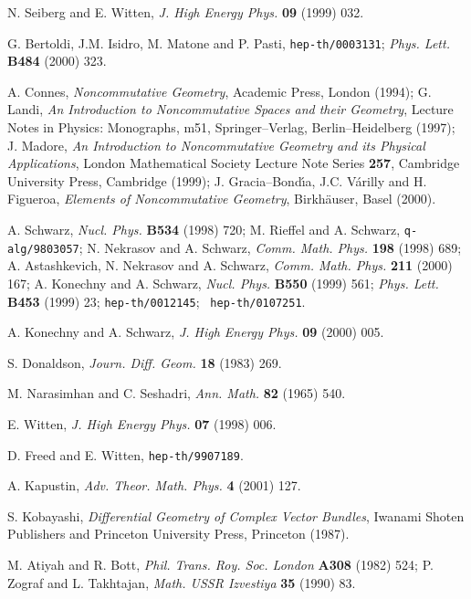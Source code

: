 \documentclass[a4paper,a4paper]{article}
\begin{document}
\begin{thebibliography}{99}
N. Seiberg and E. Witten, {\it J. High Energy Phys.} {\bf 09} (1999) 032.  

G. Bertoldi, J.M. Isidro, M. Matone and P. Pasti, {\tt hep-th/0003131}; 
{\it Phys. Lett.} {\bf B484} (2000) 323. 

A. Connes, {\it Noncommutative Geometry}, Academic Press, London (1994);
G. Landi, {\it An Introduction to Noncommutative Spaces and their Geometry}, 
Lecture Notes in Physics: Monographs, m51, Springer--Verlag, 
Berlin--Heidelberg (1997);
J. Madore, {\it An Introduction to Noncommutative Geometry and its Physical 
Applications}, London Mathematical Society Lecture Note Series {\bf 257}, 
Cambridge University Press, Cambridge (1999);
J. Gracia--Bond\'{\i}a, J.C. V\'arilly and H. Figueroa, {\it Elements of 
Noncommutative Geometry}, Birkh\"auser, Basel (2000).

A. Schwarz, {\it Nucl. Phys.} {\bf B534} (1998) 720; 
M. Rieffel and A. Schwarz, {\tt q-alg/9803057};  
N. Nekrasov and A. Schwarz, {\it Comm. Math. Phys.} {\bf 198} (1998) 689;  
A. Astashkevich, N. Nekrasov and A. Schwarz, {\it Comm. Math. Phys.} {\bf 211} (2000) 167;  
A. Konechny and A. Schwarz, {\it Nucl. Phys.} {\bf B550} (1999) 561;
{\it Phys. Lett.} {\bf B453} (1999) 23; {\tt hep-th/0012145}; {\tt 
hep-th/0107251}.

A. Konechny and A. Schwarz, {\it J. High Energy Phys.} {\bf 09} (2000) 005.  

S. Donaldson, {\it Journ. Diff. Geom.} {\bf 18} (1983) 269.  

M. Narasimhan and C. Seshadri, {\it Ann. Math.} {\bf 82} (1965) 540. 

E. Witten, {\it J. High Energy Phys.} {\bf 07} (1998) 006.
 
D. Freed and E. Witten, {\tt hep-th/9907189}. 

A. Kapustin, {\it Adv. Theor. Math. Phys.} {\bf 4} (2001) 127. 

S. Kobayashi, {\it Differential Geometry of Complex Vector Bundles},   
Iwanami Shoten Publishers and Princeton University Press, Princeton (1987).

M. Atiyah and R. Bott, {\it Phil. Trans. Roy. Soc. London} {\bf A308} (1982) 524;
P. Zograf and L. Takhtajan,  {\it Math. USSR  Izvestiya} {\bf 35} (1990) 83.    


\end{thebibliography}
\end{document}
